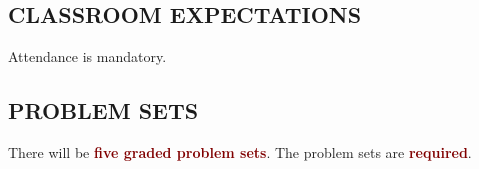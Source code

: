 \documentclass[12pt]{article}
\newcommand\newbold[1]{\textcolor{maroon}{\textbf{#1}}}
\begin{document}
\subsection*{CLASSROOM EXPECTATIONS}

Attendance is mandatory.




\subsection*{PROBLEM SETS}

There will be \newbold{five graded problem sets}.
The problem sets are \newbold{required}.
\end{document}
